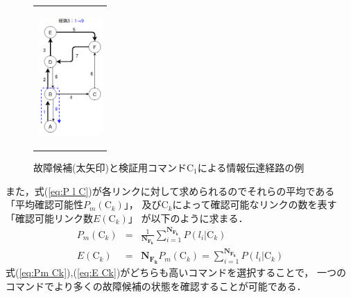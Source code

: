 \documentclass[11pt]{jsarticle}%
\begin{document}
\begin{multicols}{2}
\begin{figure}[H]
\begin{tabular}{c}
\begin{minipage}{0.30\hsize}
           \label{fig:route2}
        \end{minipage}
        \begin{minipage}{0.30\hsize}
           \centering
           \includegraphics[height=4.5cm]{../figure/route3.png}
              \label{fig:route2}
           \end{minipage}
     \end{tabular} 
     \caption{故障候補(太矢印)と検証用コマンドC$_1$による情報伝達経路の例}%
     \label{fig:route}
\end{figure}
\vspace{-1zh}
また，式(\ref{eq:P l C})が各リンクに対して求められるのでそれらの平均である
「平均確認可能性$P_m(\text{C}_k)$」，
及びC$_k$によって確認可能なリンクの数を表す「確認可能リンク数$E(\text{C}_k)$」
が以下のように求まる．
\begin{eqnarray}
  P_m(\text{C}_k) &=& \frac{1}{\mathbf{N_{F_k}}}\sum_{i=1}^{\mathbf{N_{F_k}}}
  P(l_i|\text{C}_k) \label{eq:Pm Ck} \\
  E(\text{C}_k) &=& \mathbf{N_{F_k}}P_m(\text{C}_k) =
   \sum_{i=1}^{\mathbf{N_{F_k}}}P(l_i|\text{C}_k) \label{eq:E Ck}
\end{eqnarray}
式(\ref{eq:Pm Ck}),(\ref{eq:E Ck})がどちらも高いコマンドを選択することで，
一つのコマンドでより多くの故障候補の状態を確認することが可能である．


\end{multicols}
\end{document}
